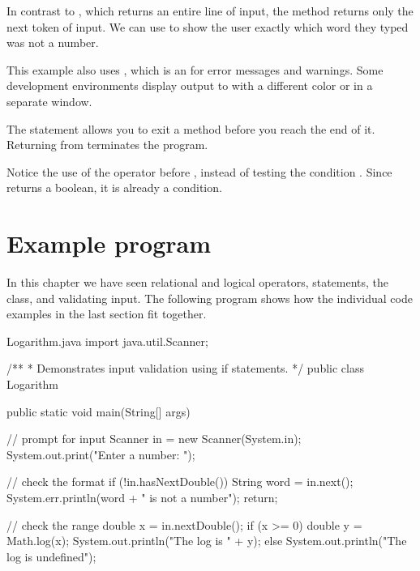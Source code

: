 
In contrast to , which returns an entire line of input, the  method returns only the next token of input.
We can use  to show the user exactly which word they typed was not a number.


This example also uses , which is an  for error messages and warnings.
Some development environments display output to  with a different color or in a separate window.


The  statement allows you to exit a method before you reach the end of it.
Returning from  terminates the program.

Notice the use of the \java{!} operator before , instead of testing the condition .
Since  returns a boolean, it is already a condition.


\section{Example program}

In this chapter we have seen relational and logical operators,  statements, the  class, and validating input.
The following program shows how the individual code examples in the last section fit together.


\begin{trinket}{Logarithm.java}
import java.util.Scanner;

/**
 * Demonstrates input validation using if statements.
 */
public class Logarithm {

    public static void main(String[] args) {

        // prompt for input
        Scanner in = new Scanner(System.in);
        System.out.print("Enter a number: ");

        // check the format
        if (!in.hasNextDouble()) {
            String word = in.next();
            System.err.println(word + " is not a number");
            return;
        }

        // check the range
        double x = in.nextDouble();
        if (x >= 0) {
            double y = Math.log(x);
            System.out.println("The log is " + y);
        } else {
            System.out.println("The log is undefined");
        }
    }
}
\end{trinket}

